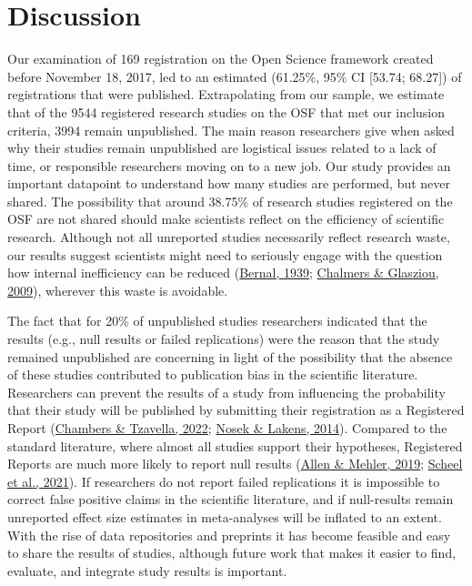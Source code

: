 \documentclass[
  ,jou, a4paper,floatsintext]{apa6}
\begin{document}
\hypertarget{discussion}{%
\section{Discussion}\label{discussion}}

Our examination of 169 registration on the Open Science framework created before November 18, 2017, led to an estimated (61.25\%, 95\% CI {[}53.74; 68.27{]}) of registrations that were published. Extrapolating from our sample, we estimate that of the 9544 registered research studies on the OSF that met our inclusion criteria, 3994 remain unpublished. The main reason researchers give when asked why their studies remain unpublished are logistical issues related to a lack of time, or responsible researchers moving on to a new job. Our study provides an important datapoint to understand how many studies are performed, but never shared. The possibility that around 38.75\% of research studies registered on the OSF are not shared should make scientists reflect on the efficiency of scientific research. Although not all unreported studies necessarily reflect research waste, our results suggest scientists might need to seriously engage with the question how internal inefficiency can be reduced (\protect\hyperlink{ref-bernal_social_1939}{Bernal, 1939}; \protect\hyperlink{ref-chalmers_avoidable_2009}{Chalmers \& Glasziou, 2009}), wherever this waste is avoidable.

The fact that for 20\% of unpublished studies researchers indicated that the results (e.g., null results or failed replications) were the reason that the study remained unpublished are concerning in light of the possibility that the absence of these studies contributed to publication bias in the scientific literature. Researchers can prevent the results of a study from influencing the probability that their study will be published by submitting their registration as a Registered Report (\protect\hyperlink{ref-chambers_past_2022}{Chambers \& Tzavella, 2022}; \protect\hyperlink{ref-nosek_registered_2014}{Nosek \& Lakens, 2014}). Compared to the standard literature, where almost all studies support their hypotheses, Registered Reports are much more likely to report null results (\protect\hyperlink{ref-allen_open_2019}{Allen \& Mehler, 2019}; \protect\hyperlink{ref-scheel_excess_2021}{Scheel et al., 2021}). If researchers do not report failed replications it is impossible to correct false positive claims in the scientific literature, and if null-results remain unreported effect size estimates in meta-analyses will be inflated to an extent. With the rise of data repositories and preprints it has become feasible and easy to share the results of studies, although future work that makes it easier to find, evaluate, and integrate study results is important.
\end{document}
